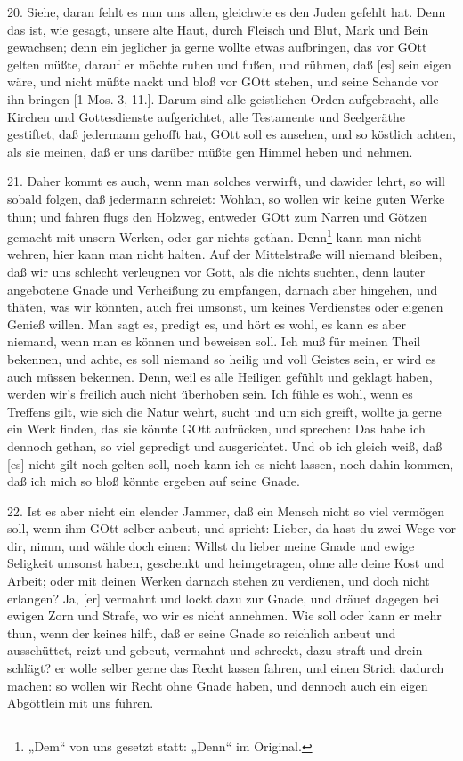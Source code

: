 20. Siehe, daran fehlt es nun uns allen, gleichwie es den Juden gefehlt hat. Denn das ist, wie gesagt, unsere alte Haut, durch Fleisch und Blut, Mark und Bein gewachsen; denn ein jeglicher ja gerne wollte etwas aufbringen, das vor GOtt gelten müßte, darauf er möchte ruhen und fußen, und rühmen, daß [es] sein eigen wäre, und nicht müßte nackt und bloß vor GOtt stehen, und seine Schande vor ihn bringen [1 Mos. 3, 11.]. Darum sind alle geistlichen Orden aufgebracht, alle Kirchen und Gottesdienste aufgerichtet, alle Testamente und Seelgeräthe gestiftet, daß jedermann gehofft hat, GOtt soll es ansehen, und so köstlich achten, als sie meinen, daß er uns darüber müßte gen Himmel heben und nehmen.

21. Daher kommt es auch, wenn man solches verwirft, und dawider lehrt, so will sobald folgen, daß jedermann schreiet: Wohlan, so wollen wir keine guten Werke thun; und fahren flugs den Holzweg, entweder GOtt zum Narren und Götzen gemacht mit unsern Werken, oder gar nichts gethan. Denn\footnote{„Dem“ von uns gesetzt statt: „Denn“ im Original.} kann man nicht wehren, hier kann man nicht halten. Auf der Mittelstraße will niemand bleiben, daß wir uns schlecht verleugnen vor Gott, als die nichts suchten, denn lauter angebotene Gnade und Verheißung zu empfangen, darnach aber hingehen, und thäten, was wir könnten, auch frei umsonst, um keines Verdienstes oder eigenen Genieß willen. Man sagt es, predigt es, und hört es wohl, es kann es aber niemand, wenn man es können und beweisen soll. Ich muß für meinen Theil bekennen, und achte, es soll niemand so heilig und voll Geistes sein, er wird es auch müssen bekennen. Denn, weil es alle Heiligen gefühlt und geklagt haben, werden wir's freilich auch nicht überhoben sein. Ich fühle es wohl, wenn es Treffens gilt, wie sich die Natur wehrt, sucht und um sich greift, wollte ja gerne ein Werk finden, das sie könnte GOtt aufrücken, und sprechen: Das habe ich dennoch gethan, so viel gepredigt und ausgerichtet. Und ob ich gleich weiß, daß [es] nicht gilt noch gelten soll, noch kann ich es nicht lassen, noch dahin kommen, daß ich mich so bloß könnte ergeben auf seine Gnade.

22. Ist es aber nicht ein elender Jammer, daß ein Mensch nicht so viel vermögen soll, wenn ihm GOtt selber anbeut, und spricht: Lieber, da hast du zwei Wege vor dir, nimm,
und wähle doch einen: Willst du lieber meine Gnade und ewige Seligkeit umsonst haben, geschenkt und heimgetragen, ohne alle deine Kost und Arbeit; oder mit deinen Werken darnach stehen zu verdienen, und doch nicht erlangen? Ja, [er] vermahnt und lockt dazu zur Gnade, und dräuet dagegen bei ewigen Zorn und Strafe, wo wir es nicht annehmen. Wie soll oder kann er mehr thun, wenn der keines hilft, daß er seine Gnade so reichlich anbeut und ausschüttet, reizt und gebeut, vermahnt und schreckt, dazu straft und drein schlägt? er wolle selber gerne das Recht lassen fahren, und einen Strich dadurch machen: so wollen wir Recht ohne Gnade haben, und dennoch auch ein eigen Abgöttlein mit uns führen.

